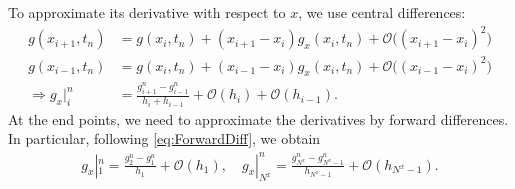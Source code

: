 \documentclass[11pt]{article}
\begin{document}
To approximate its derivative with respect to $x$, we use central differences:
\begin{align*}
    g(x_{i+1}, t_n)       & = g(x_i, t_n) +  (x_{i+1}-x_i)g_x(x_i, t_n) + \mathcal{O}\big((x_{i+1}-x_i)^2\big) \\
    g(x_{i-1}, t_n)       & = g(x_i, t_n) +  (x_{i-1}-x_i)g_x(x_i, t_n) + \mathcal{O}\big((x_{i-1}-x_i)^2\big) \\    
    \Rightarrow g_x|_i^n & = \frac{g_{i+1}^n-g_{i-1}^n}{h_i + h_{i-1}} + \mathcal{O}(h_i) + \mathcal{O}(h_{i-1}).
\end{align*}
At the end points, we need to approximate the derivatives by forward differences. In particular, following \eqref{eq:ForwardDiff}, 
we obtain
\begin{align*}
    g_x|_1^n = \frac{g_2^n -g_1^n}{h_1} + \mathcal{O}(h_1), \quad g_x|_{N^x}^n = \frac{g_{N^x}^n -g_{N^x-1}^n}{h_{N^x-1}} + \mathcal{O}(h_{N^x-1}).
\end{align*}
\end{document}
